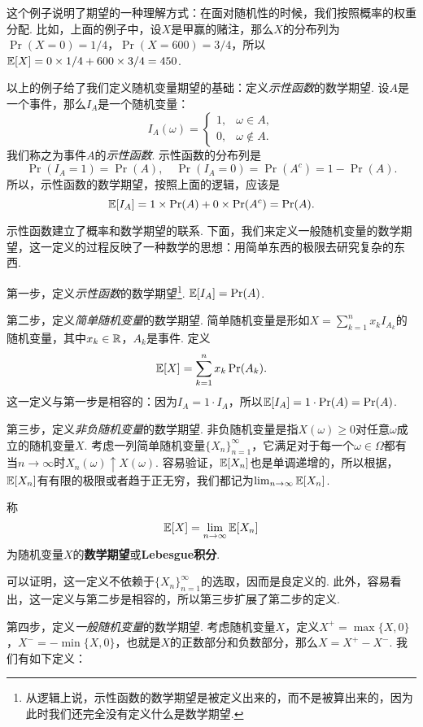 这个例子说明了期望的一种理解方式：在面对随机性的时候，我们按照概率的权重分配. 比如，上面的例子中，设$X$是甲赢的赌注，那么$X$的分布列为$\Pr(X=0)=1/4$，$\Pr(X=600)=3/4$，所以$\mathbb{E}[X]=0\times 1/4+600\times 3/4=450$.

以上的例子给了我们定义随机变量期望的基础：定义\emph{示性函数}的数学期望. 设$A$是一个事件，那么$I_A$是一个随机变量：
\[I_A(\omega)=\begin{cases}
    1,&\omega\in A,\\
    0,&\omega\notin A.
\end{cases}\]
我们称之为事件$A$的\emph{示性函数}. 示性函数的分布列是
\[\Pr(I_A=1)=\Pr(A),\quad \Pr(I_A=0)=\Pr(A^c)=1-\Pr(A).\]
所以，示性函数的数学期望，按照上面的逻辑，应该是
\[\mathbb{E}[I_A]=1\times\Pr(A)+0\times\Pr(A^c)=\Pr(A).\]

示性函数建立了概率和数学期望的联系. 下面，我们来定义一般随机变量的数学期望，这一定义的过程反映了一种数学的思想：用简单东西的极限去研究复杂的东西. 

第一步，定义\emph{示性函数}的数学期望\footnote{从逻辑上说，示性函数的数学期望是被定义出来的，而不是被算出来的，因为此时我们还完全没有定义什么是数学期望. }. $\mathbb{E}[I_A]=\Pr(A)$.

第二步，定义\emph{简单随机变量}的数学期望. 简单随机变量是形如$X=\sum_{k=1}^n x_kI_{A_k}$的随机变量，其中$x_k\in\mathbb{R}$，$A_k$是事件. 定义
\[\mathbb{E}[X]=\sum_{k=1}^n x_k\Pr(A_k).\]
这一定义与第一步是相容的：因为$I_A=1\cdot I_{A}$，所以$\mathbb{E}[I_A]=1\cdot\Pr(A)=\Pr(A)$. 

第三步，定义\emph{非负随机变量}的数学期望. 非负随机变量是指$X(\omega)\geq 0$对任意$\omega$成立的随机变量$X$. 考虑一列简单随机变量$\{X_n\}_{n=1}^\infty$，它满足对于每一个$\omega\in\Omega$都有当$n\to\infty$时$X_n(\omega)\uparrow X(\omega)$. 容易验证，$\mathbb{E}[X_n]$也是单调递增的，所以根据，$\mathbb{E}[X_n]$有有限的极限或者趋于正无穷，我们都记为$\lim_{n\to\infty} \mathbb{E}[X_n]$.

\begin{definition}
称
\[\mathbb{E}[X]=\lim_{n\to\infty}\mathbb{E}[X_n]\]
为随机变量$X$的\textbf{数学期望}或\textbf{Lebesgue积分}. 
\end{definition}

可以证明，这一定义不依赖于$\{X_n\}_{n=1}^\infty$的选取，因而是良定义的. 此外，容易看出，这一定义与第二步是相容的，所以第三步扩展了第二步的定义. 

第四步，定义\emph{一般随机变量}的数学期望. 考虑随机变量$X$，定义$X^+=\max\{X,0\}$，$X^-=-\min\{X,0\}$，也就是$X$的正数部分和负数部分，那么$X=X^+-X^-$. 我们有如下定义：

